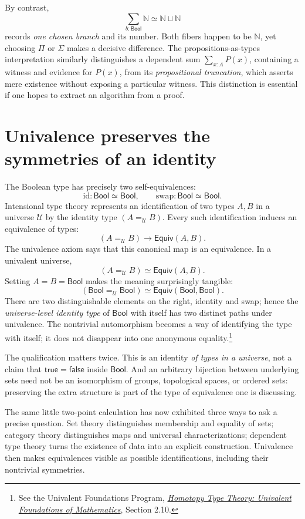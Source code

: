 By contrast,
\[
 \sum_{b:\mathsf{Bool}}\mathbb N
 \simeq\mathbb N\sqcup\mathbb N
\]
records \emph{one chosen branch} and its number. Both fibers happen to be $\mathbb N$, yet choosing $\Pi$ or $\Sigma$ makes a decisive difference. The propositions-as-types interpretation similarly distinguishes a dependent sum $\sum_{x:A}P(x)$, containing a witness and evidence for $P(x)$, from its \emph{propositional truncation}, which asserts mere existence without exposing a particular witness. This distinction is essential if one hopes to extract an algorithm from a proof.

\section{Univalence preserves the symmetries of an identity}

The Boolean type has precisely two self-equivalences:
\[
 \mathrm{id}:\mathsf{Bool}\simeq\mathsf{Bool},
 \qquad
 \mathrm{swap}:\mathsf{Bool}\simeq\mathsf{Bool}.
\]
Intensional type theory represents an identification of two types $A,B$ in a universe $\mathcal U$ by the identity type $(A=_{\mathcal U}B)$. Every such identification induces an equivalence of types:
\[
 (A=_{\mathcal U}B)\longrightarrow\mathsf{Equiv}(A,B).
\]
The univalence axiom says that this canonical map is an equivalence. In a univalent universe,
\[
 \boxed{(A=_{\mathcal U}B)\simeq\mathsf{Equiv}(A,B).}
\]
Setting $A=B=\mathsf{Bool}$ makes the meaning surprisingly tangible:
\[
 (\mathsf{Bool}=_{\mathcal U}\mathsf{Bool})
 \simeq\mathsf{Equiv}(\mathsf{Bool},\mathsf{Bool}).
\]
There are two distinguishable elements on the right, identity and swap; hence the \emph{universe-level identity type} of $\mathsf{Bool}$ with itself has two distinct paths under univalence. The nontrivial automorphism becomes a way of identifying the type with itself; it does not disappear into one anonymous equality.\footnote{See the Univalent Foundations Program, \href{https://homotopytypetheory.org/book/}{\emph{Homotopy Type Theory: Univalent Foundations of Mathematics}}, Section 2.10.}

The qualification matters twice. This is an identity \emph{of types in a universe}, not a claim that $\mathsf{true}=\mathsf{false}$ inside $\mathsf{Bool}$. And an arbitrary bijection between underlying sets need not be an isomorphism of groups, topological spaces, or ordered sets: preserving the extra structure is part of the type of equivalence one is discussing.

The same little two-point calculation has now exhibited three ways to ask a precise question. Set theory distinguishes membership and equality of sets; category theory distinguishes maps and universal characterizations; dependent type theory turns the existence of data into an explicit construction. Univalence then makes equivalences visible as possible identifications, including their nontrivial symmetries.
